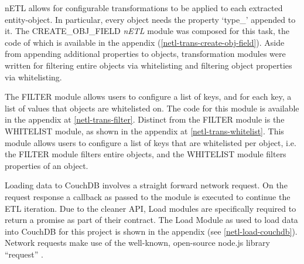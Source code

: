 nETL allows for configurable transformations to be applied to each extracted entity-object. In particular, every object needs the property `type\_' appended to it. The CREATE\_OBJ\_FIELD \textit{nETL} module was composed for this task, the code of which is available in the appendix (\ref{netl-trans-create-obj-field}). Aside from appending additional properties to objects, transformation modules were written for filtering entire objects via whitelisting and filtering object properties via whitelisting.

The FILTER module allows users to configure a list of keys, and for each key, a list of values that objects are whitelisted on. The code for this module is available in the appendix at \ref{netl-trans-filter}. Distinct from the FILTER module is the WHITELIST module, as shown in the appendix at \ref{netl-trans-whitelist}. This module allows users to configure a list of keys that are whitelisted per object, i.e. the FILTER module filters entire objects, and the WHITELIST module filters properties of an object.

Loading data to CouchDB involves a straight forward network request. On the request response a callback as passed to the module is executed to continue the ETL iteration. Due to the cleaner API, Load modules are specifically required to return a promise as part of their contract. The Load Module as used to load data into CouchDB for this project is shown in the appendix (see \ref{netl-load-couchdb}). Network requests make use of the well-known, open-source node.js library ``request'' \cite{request-lib}.